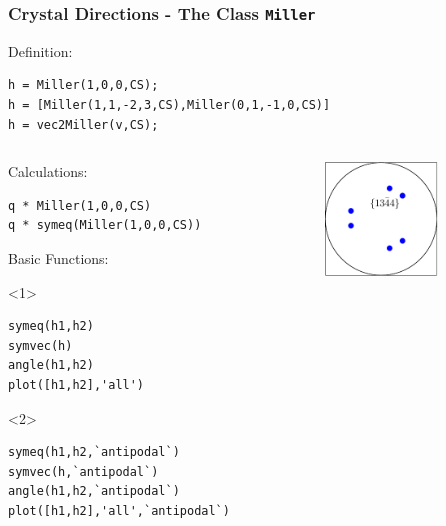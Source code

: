 \begin{frame}[fragile]
  \frametitle{Crystal Directions - The \MTEX Class \texttt{\bf Miller}}

  Definition:

\begin{lstlisting}
h = Miller(1,0,0,CS);
h = [Miller(1,1,-2,3,CS),Miller(0,1,-1,0,CS)]
h = vec2Miller(v,CS);
\end{lstlisting}

\medskip

\begin{columns}
  \begin{column}{8.5cm}

    Calculations:

\begin{lstlisting}
q * Miller(1,0,0,CS)
q * symeq(Miller(1,0,0,CS))
\end{lstlisting}

    \medskip

    Basic Functions:


    \begin{onlyenv}<1>
\begin{lstlisting}
symeq(h1,h2)
symvec(h)
angle(h1,h2)
plot([h1,h2],'all')
\end{lstlisting}
    \end{onlyenv}

    \begin{onlyenv}<2>
\begin{lstlisting}
symeq(h1,h2,`antipodal`)
symvec(h,`antipodal`)
angle(h1,h2,`antipodal`)
plot([h1,h2],'all',`antipodal`)
\end{lstlisting}
    \end{onlyenv}

  \end{column}

  \begin{column}{3cm}
    \includegraphics[width=3cm]{pic/miller}
  \end{column}

\end{columns}

\end{frame}


